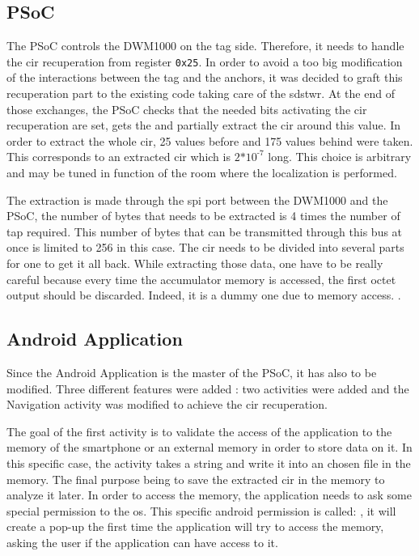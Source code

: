 \subsection{PSoC}

The PSoC controls the DWM1000 on the tag side. Therefore, it needs to handle the \gls{cir} recuperation from register \texttt{0x25}. In order to avoid a too big modification of the interactions between the tag and the anchors, it was decided to graft this recuperation part to the existing code taking care of the \gls{sdstwr}. At the end of those exchanges, the PSoC checks that the needed bits activating the \gls{cir} recuperation are set, gets the  and partially extract the \gls{cir} around this value. In order to extract the whole \gls{cir}, 25 values before and 175 values behind were taken. This corresponds to an extracted \gls{cir} which is $\text{2*10}^\text{-7}$  long. This choice is arbitrary and may be tuned in function of the room where the localization is performed.
\vspace{2mm}

The extraction is made through the \gls{spi} port between the DWM1000 and the PSoC, the number of bytes that needs to be extracted is 4 times the number of tap required. This number of bytes that can be transmitted through this bus at once is limited to 256 in this case. The \gls{cir} needs to be divided into several parts for one to get it all back. While extracting those data, one have to be really careful because every time the accumulator memory is accessed, the first octet output should be discarded. Indeed, it is a dummy one due to memory access. \cite{usermanual}.

\subsection{Android Application}

Since the Android Application is the master of the PSoC, it has also to be modified. Three different features were added : two activities were added and the Navigation activity was modified to achieve the \gls{cir} recuperation. 
\vspace{2mm}

The goal of the first activity is to validate the access of the application to the memory of the smartphone or an external memory in order to store data on it. In this specific case, the activity takes a string and write it into an chosen file in the memory. The final purpose being to save the extracted \gls{cir} in the memory to analyze it later. In order to access the memory, the application needs to ask some special permission to the \gls{os}. This specific android permission is called: , it will create a pop-up the first time the application will try to access the memory, asking the user if the application can have access to it.
\vspace{2mm}


